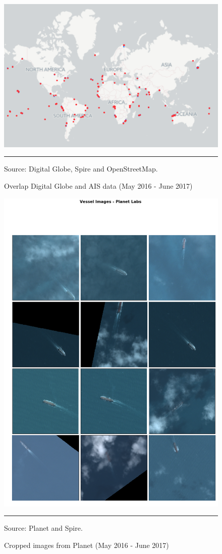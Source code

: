 \begin{figure}[H]
	\centering \caption{Overlap Digital Globe and AIS data (May 2016 - June 2017)}\label{overlap}
\includegraphics[width=0.6\linewidth]{images/overlap_gbdx.png} 
\begin{flushleft}
\rule{1.2in}{0em} \scriptsize Source: Digital Globe, Spire and OpenStreetMap. \\
\par
\end{flushleft}
\end{figure}

\begin{figure}[H]
	\centering \caption{Cropped images from Planet (May 2016 - June 2017)}\label{mosaic}
	\includegraphics[trim={0 0 0 2cm},clip,width=0.6\linewidth]{images/mosaic_planet_torres_strait.png} 
\begin{flushleft}
\rule{1.2in}{0em} \scriptsize Source: Planet and Spire. \\
\par
\end{flushleft}
\end{figure}


